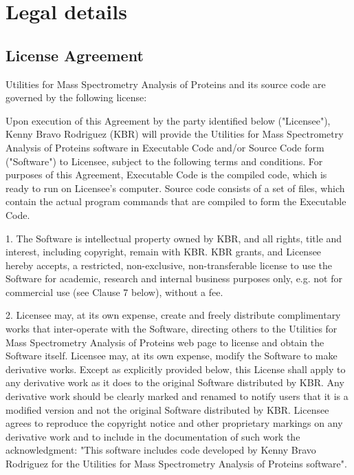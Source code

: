 \chapter{Legal details}
\label{chap:licagre}

\section{License Agreement}

Utilities for Mass Spectrometry Analysis of Proteins and its source code are governed by the following license:

Upon execution of this Agreement by the party identified below ("Licensee"), Kenny Bravo Rodriguez (KBR) will provide the Utilities for Mass Spectrometry Analysis of Proteins software in Executable Code and/or Source Code form ("Software") to Licensee, subject to the following terms and conditions. For purposes of this Agreement, Executable Code is the compiled code, which is ready to run on Licensee's computer. Source code consists of a set of files, which contain the actual program commands that are compiled to form the Executable Code.

1. The Software is intellectual property owned by KBR, and all rights, title and interest, including copyright, remain with KBR. KBR grants, and Licensee hereby accepts, a restricted, non-exclusive, non-transferable license to use the Software for academic, research and internal business purposes only, e.g. not for commercial use (see Clause 7 below), without a fee.

2. Licensee may, at its own expense, create and freely distribute complimentary works that inter-operate with the Software, directing others to the Utilities for Mass Spectrometry Analysis of Proteins web page to license and obtain the Software itself. Licensee may, at its own expense, modify the Software to make derivative works. Except as explicitly provided below, this License shall apply to any derivative work as it does to the original Software distributed by KBR. Any derivative work should be clearly marked and renamed to notify users that it is a modified version and not the original Software distributed by KBR. Licensee agrees to reproduce the copyright notice and other proprietary markings on any derivative work and to include in the documentation of such work the acknowledgment: "This software includes code developed by Kenny Bravo Rodriguez for the Utilities for Mass Spectrometry Analysis of Proteins software".

